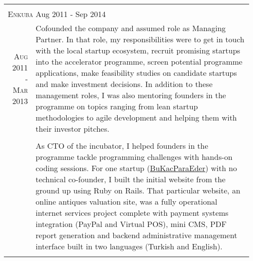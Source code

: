 \documentclass[a4paper,10pt]{article}
\newcommand{\exptitle}[2]{
  \multicolumn{2}{l}{\textsc{#1} \footnotesize{#2}} \\
  \specialrule{.01em}{0.5em}{1em}
}
\begin{document}
\begin{longtable}{r|p{11cm}}
  \multicolumn{2}{c}{} \\

  \exptitle{Enkuba}{Aug 2011 - Sep 2014}

  \textsc{Aug 2011 - Mar 2013}  & Cofounded the company and assumed role as Managing Partner. In that role, my responsibilities were to get in touch with the local startup ecosystem, recruit promising startups into the accelerator programme, screen potential programme applications, make feasibility studies on candidate startups and make investment decisions. In addition to these management roles, I was also mentoring founders in the programme on topics ranging from lean startup methodologies to agile development and helping them with their investor pitches. \\
                                & \\
                                & As CTO of the incubator, I helped founders in the programme tackle programming challenges with hands-on coding sessions. For one startup (\href{http://www.bukacparaeder.com}{BuKacParaEder}) with no technical co-founder, I built the initial website from the ground up using Ruby on Rails. That particular website, an online antiques valuation site, was a fully operational internet services project complete with payment systems integration (PayPal and Virtual POS), mini CMS, PDF report generation and backend administrative management interface built in two languages (Turkish and English). \\
  \multicolumn{2}{c}{} \\


\end{longtable}
\end{document}
